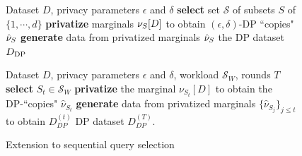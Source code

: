 \begin{figure}[!t]
\begin{minipage}[t]{.46\textwidth}
\noindent
\begin{algorithm}[H]
\caption{Standard data synthesis framework}\label{alg:mainalgo}
\begin{algorithmic}[1]
\Require Dataset $D$, privacy parameters $\epsilon$ and $\delta$
\State \textbf{select} set $\mathcal S$ of subsets $S$ of $\{1, \cdots, d\}$
\State \textbf{privatize} marginals $\nu_{S}[D]$ to obtain $(\epsilon, \delta)$-DP ``copies" $\hat \nu_{S}$
\State \textbf{generate} data from privatized marginals $\hat \nu_{S}$
\Statex\Return the DP dataset $D_{\text{DP}}$
\end{algorithmic}
\end{algorithm}
\end{minipage}
\hfill
\begin{minipage}[t]{.52\textwidth}
\begin{algorithm}[H]
\caption{Extension to sequential query selection}\label{alg:mwem}
\begin{algorithmic}[1]
\Require Dataset \(D\), privacy parameters \(\epsilon\) and \(\delta\), workload \(\mathcal{S}_W\), rounds \(T\)
    \State \textbf{select} \(S_t \in \mathcal{S}_W\)
    \State \textbf{privatize} the marginal \(\nu_{S_t}[D]\) to obtain the 
    \Statex\hspace{\algorithmicindent}\hspace{\algorithmicindent}DP-``copies" \(\hat{\nu}_{S_t}\)
    \State \textbf{generate} data from privatized marginals 
    \Statex\hspace{\algorithmicindent}\hspace{\algorithmicindent}\(\{\hat{\nu}_{S_j}\}_{j\leq t}\) to obtain \(D^{(t)}_{DP}\)
\EndFor
\State \Return DP dataset \(D^{(T)}_{DP}\).
\end{algorithmic}
\end{algorithm}
\end{minipage}
\end{figure}

